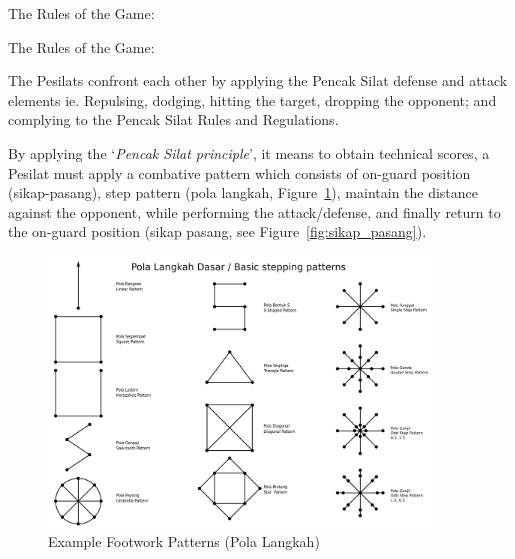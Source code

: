 \begin{legal}
\item The Rules of the Game:
    \begin{legal}
    \item The Rules of the Game:
        \begin{legal}
        \item The Pesilats confront each other by applying the Pencak Silat defense and attack
              elements ie. Repulsing, dodging, hitting the target, dropping the opponent; and
              complying to the Pencak Silat Rules and Regulations.
        \item  By applying the `\emph{Pencak Silat principle}', it means to obtain technical scores, a Pesilat
               must apply a combative pattern which consists of on-guard position (sikap-pasang),
               step pattern (pola langkah, Figure~\ref{fig:pola_langkah}), maintain the distance 
               against the opponent, while
               performing the attack/defense, and finally return to the on-guard position (sikap
               pasang, see Figure~\ref{fig:sikap_pasang}).

            \begin{figure}[t!]
                \centering
                \includegraphics[width=4.0in]{images/pola_langkah_dasar}
                \caption{Example Footwork Patterns (Pola Langkah)}
\label{fig:pola_langkah}
            \end{figure}


\end{legal}
\end{legal}
\end{legal}
